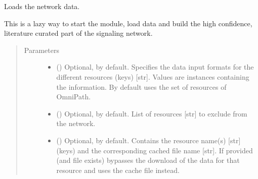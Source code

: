 \documentclass[letterpaper,10pt,english]{sphinxmanual}
\begin{document}
\begin{fulllineitems}
\begin{fulllineitems}
\begin{quote}
\begin{description}
\end{description}\end{quote}

\end{fulllineitems}


\begin{fulllineitems}
\label{\detokenize{main:pypath.main.PyPath.init_gsea}}
\end{fulllineitems}


\begin{fulllineitems}
\label{\detokenize{main:pypath.main.PyPath.init_network}}
Loads the network data.

This is a lazy way to start the module, load data and build the
high confidence, literature curated part of the signaling
network.
\begin{quote}\begin{description}
\item[{Parameters}] \leavevmode\begin{itemize}
\item {} 
 () \textendash{} Optional,  by default. Specifies the data input
formats for the different resources (keys) {[}str{]}. Values
are  instances
containing the information. By default uses the set of
resources of OmniPath.

\item {} 
 () \textendash{} Optional, \sphinxcode{\sphinxupquote{{[}{]}}} by default. List of resources {[}str{]} to
exclude from the network.

\item {} 
 () \textendash{} Optional, \sphinxcode{\sphinxupquote{\{\}}} by default. Contains the resource name(s)
{[}str{]} (keys) and the corresponding cached file name {[}str{]}.
If provided (and file exists) bypasses the download of the
data for that resource and uses the cache file instead.


\end{itemize}
\end{description}
\end{quote}
\end{fulllineitems}
\end{fulllineitems}
\end{document}
